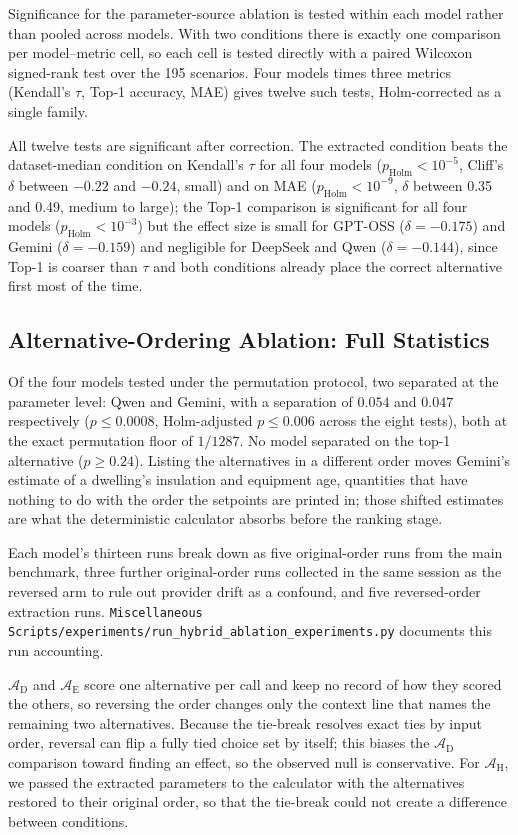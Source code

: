 \documentclass[11pt]{article}
\begin{document}
Significance for the parameter-source ablation is tested within each model rather than pooled across models. With two conditions there is exactly one comparison per model--metric cell, so each cell is tested directly with a paired Wilcoxon signed-rank test over the 195 scenarios. Four models times three metrics (Kendall's $\tau$, Top-1 accuracy, MAE) gives twelve such tests, Holm-corrected as a single family.

All twelve tests are significant after correction. The extracted condition beats the dataset-median condition on Kendall's $\tau$ for all four models ($p_{\text{Holm}} < 10^{-5}$, Cliff's $\delta$ between $-0.22$ and $-0.24$, small) and on MAE ($p_{\text{Holm}} < 10^{-9}$, $\delta$ between 0.35 and 0.49, medium to large); the Top-1 comparison is significant for all four models ($p_{\text{Holm}} < 10^{-3}$) but the effect size is small for GPT-OSS ($\delta=-0.175$) and Gemini ($\delta=-0.159$) and negligible for DeepSeek and Qwen ($\delta=-0.144$), since Top-1 is coarser than $\tau$ and both conditions already place the correct alternative first most of the time.

\subsection{Alternative-Ordering Ablation: Full Statistics}
\label{app:alternative-order-full}

Of the four models tested under the permutation protocol, two separated at the parameter level: Qwen and Gemini, with a separation of $0.054$ and $0.047$ respectively ($p \leq 0.0008$, Holm-adjusted $p \leq 0.006$ across the eight tests), both at the exact permutation floor of $1/1287$. No model separated on the top-1 alternative ($p \geq 0.24$). Listing the alternatives in a different order moves Gemini's estimate of a dwelling's insulation and equipment age, quantities that have nothing to do with the order the setpoints are printed in; those shifted estimates are what the deterministic calculator absorbs before the ranking stage.

Each model's thirteen runs break down as five original-order runs from the
main benchmark, three further original-order runs collected in the same
session as the reversed arm to rule out provider drift as a confound, and
five reversed-order extraction runs.
\texttt{Miscellaneous Scripts/experiments/run\_hybrid\_ablation\_experiments.py}
documents this run accounting.

$\mathcal{A}_{\text{D}}$ and $\mathcal{A}_{\text{E}}$ score one alternative per call and keep no record of how they scored the others, so reversing the order changes only the context line that names the remaining two alternatives. Because the tie-break resolves exact ties by input order, reversal can flip a fully tied choice set by itself; this biases the $\mathcal{A}_{\text{D}}$ comparison toward finding an effect, so the observed null is conservative. For $\mathcal{A}_{\text{H}}$, we passed the extracted parameters to the calculator with the alternatives restored to their original order, so that the tie-break could not create a difference between conditions.
\end{document}
